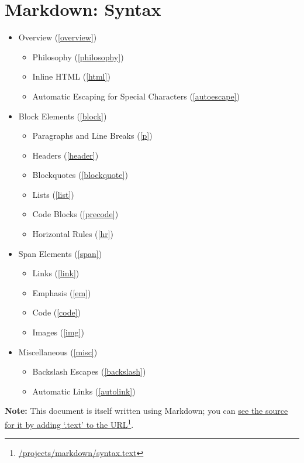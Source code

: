 \part{Markdown: Syntax}
\label{markdown:syntax}

\begin{itemize}
\item Overview (\autoref{overview})

\begin{itemize}
\item Philosophy (\autoref{philosophy})
\item Inline HTML (\autoref{html})
\item Automatic Escaping for Special Characters (\autoref{autoescape})
\end{itemize}
\item Block Elements (\autoref{block})

\begin{itemize}
\item Paragraphs and Line Breaks (\autoref{p})
\item Headers (\autoref{header})
\item Blockquotes (\autoref{blockquote})
\item Lists (\autoref{list})
\item Code Blocks (\autoref{precode})
\item Horizontal Rules (\autoref{hr})
\end{itemize}
\item Span Elements (\autoref{span})

\begin{itemize}
\item Links (\autoref{link})
\item Emphasis (\autoref{em})
\item Code (\autoref{code})
\item Images (\autoref{img})
\end{itemize}
\item Miscellaneous (\autoref{misc})

\begin{itemize}
\item Backslash Escapes (\autoref{backslash})
\item Automatic Links (\autoref{autolink})
\end{itemize}
\end{itemize}

\textbf{Note:} This document is itself written using Markdown; you
can \href{/projects/markdown/syntax.text}{see the source for it by adding `.text' to the URL}\footnote{\href{/projects/markdown/syntax.text}{/projects/markdown/syntax.text}}.

